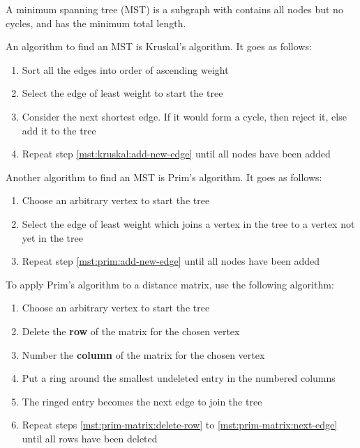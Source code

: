 \documentclass[../main.tex]{subfile}
\begin{document}

A minimum spanning tree (MST) is a subgraph with contains all nodes but no cycles, and has the minimum total length.


An algorithm to find an MST is Kruskal's algorithm. It goes as follows:

\begin{enumerate}
	\item Sort all the edges into order of ascending weight
	\item Select the edge of least weight to start the tree
	\item\label{mst:kruskal:add-new-edge} Consider the next shortest edge. If it would form a cycle, then reject it, else add it to the tree
	\item Repeat step \ref{mst:kruskal:add-new-edge} until all nodes have been added
\end{enumerate}


Another algorithm to find an MST is Prim's algorithm. It goes as follows:

\begin{enumerate}
	\item Choose an arbitrary vertex to start the tree
	\item\label{mst:prim:add-new-edge} Select the edge of least weight which joins a vertex in the tree to a vertex not yet in the tree
	\item Repeat step \ref{mst:prim:add-new-edge} until all nodes have been added
\end{enumerate}


To apply Prim's algorithm to a distance matrix, use the following algorithm:

\begin{enumerate}
	\item Choose an arbitrary vertex to start the tree
	\item\label{mst:prim-matrix:delete-row} Delete the \textbf{row} of the matrix for the chosen vertex
	\item\label{mst:prim-matrix:number-column} Number the \textbf{column} of the matrix for the chosen vertex
	\item\label{mst:prim-matrix:ring-entry} Put a ring around the smallest undeleted entry in the numbered columns
	\item\label{mst:prim-matrix:next-edge} The ringed entry becomes the next edge to join the tree
	\item Repeat steps \ref{mst:prim-matrix:delete-row} to \ref{mst:prim-matrix:next-edge} until all rows have been deleted
\end{enumerate}
\end{document}
